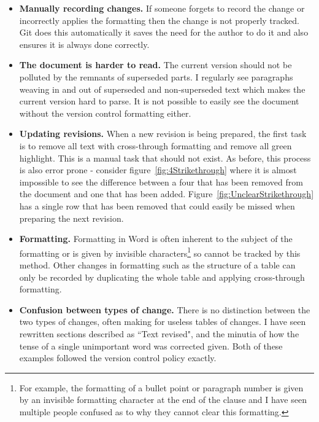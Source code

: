 \begin{itemize}
	\item \textbf{Manually recording changes.} If someone forgets to record the change or incorrectly applies the formatting then the change is not properly tracked. Git does this automatically it saves the need for the author to do it and also ensures it is always done correctly.
	\item \textbf{The document is harder to read.} The current version should not be polluted by the remnants of superseded parts. I regularly see paragraphs weaving in and out of superseded and non-superseded text which makes the current version hard to parse. It is not possible to easily see the document without the version control formatting either.
	\item \textbf{Updating revisions.} When a new revision is being prepared, the first task is to remove all text with cross-through formatting and remove all green highlight. This is a manual task that should not exist. As before, this process is also error prone - consider figure~\ref{fig:4Strikethrough} where it is almost impossible to see the difference between a four that has been removed from the document and one that has been added. Figure~\ref{fig:UnclearStrikethrough} has a single row that has been removed that could easily be missed when preparing the next revision.
	\item \textbf{Formatting.} Formatting in Word is often inherent to the subject of the formatting or is given by invisible characters\footnote{For example, the formatting of a bullet point or paragraph number is given by an invisible formatting character at the end of the clause and I have seen multiple people confused as to why they cannot clear this formatting.} so cannot be tracked by this method. Other changes in formatting such as the structure of a table can only be recorded by duplicating the whole table and applying cross-through formatting.
	\item \textbf{Confusion between types of change.} There is no distinction between the two types of changes, often making for useless tables of changes. I have seen rewritten sections described as ``Text revised", and the minutia of how the tense of a single unimportant word was corrected given. Both of these examples followed the version control policy exactly.
\end{itemize}

